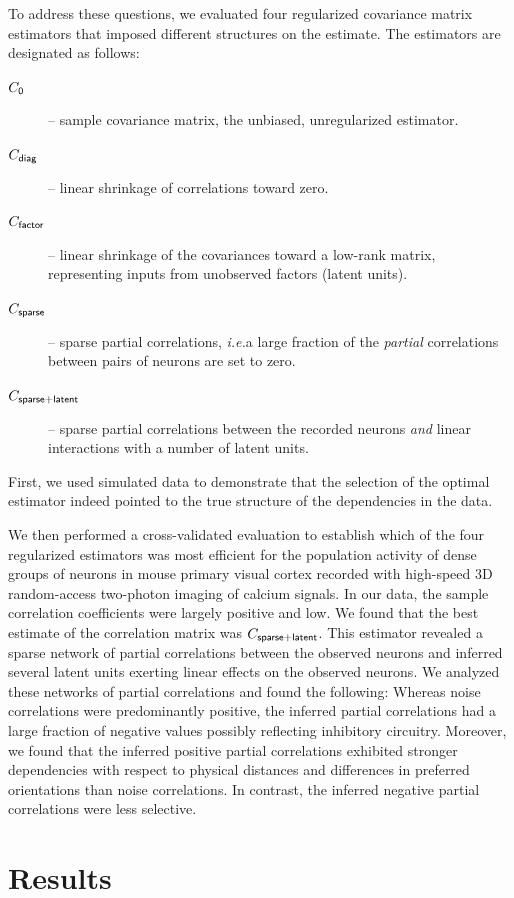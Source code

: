 \documentclass[10pt]{article}
\newcommand{\ie}{\emph{i.e.}\;}
\begin{document}
To address these questions, we evaluated four regularized covariance matrix estimators that imposed different structures on the estimate. The estimators are designated as follows:
\begin{description}
\item[$C_{\sf 0}$] -- sample covariance matrix, the unbiased, unregularized estimator.
\item[$C_{\sf diag}$] -- linear shrinkage of correlations toward zero.
\item[$C_{\sf factor}$] -- linear shrinkage of the covariances toward a low-rank matrix, representing inputs from unobserved factors (latent units).
\item[$C_{\sf sparse}$] -- sparse partial correlations, \ie a large fraction of the \emph{partial} correlations between pairs of neurons are set to zero.
\item[$C_{\sf sparse+latent}$] -- sparse partial correlations between the recorded neurons \emph{and} linear interactions with a number of latent units.
\end{description} 

First, we used simulated data to demonstrate that the selection of the optimal estimator indeed pointed to the true structure of the dependencies in the data. 

We then performed a cross-validated evaluation to establish which of the four regularized estimators was most efficient for the population activity of dense groups of neurons in mouse primary visual cortex recorded with high-speed 3D random-access two-photon imaging of calcium signals. In our data, the sample correlation coefficients were largely positive and low.  We found that the best estimate of the correlation matrix was $C_{\sf sparse+latent}$.  This estimator revealed a sparse network of partial correlations between the observed neurons and inferred several latent units exerting linear effects on the observed neurons. We analyzed these networks of partial correlations and found the following: Whereas noise correlations were predominantly positive, the inferred partial correlations had a large fraction of negative values possibly reflecting inhibitory circuitry.  Moreover, we found that the inferred positive partial correlations exhibited stronger dependencies with respect to physical distances and differences in preferred orientations than noise correlations. In contrast, the inferred negative partial correlations were less selective. 


\section*{Results}
\end{document}
